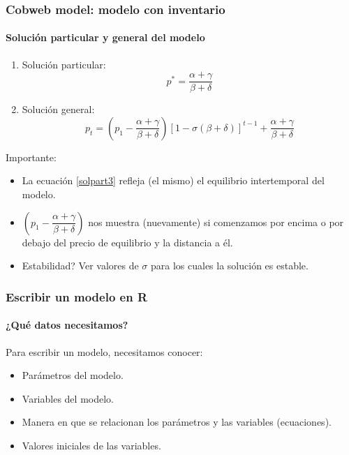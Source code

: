 \documentclass[11pt]{beamer}
\begin{document}
\begin{frame}
	\frametitle{Cobweb model: modelo con inventario}
	\framesubtitle{Solución particular y general del modelo}
	\begin{enumerate}
		\item Solución particular: 	\begin{equation}\label{solpart3}
		p^{*}=\dfrac{\alpha+\gamma}{\beta+\delta}
		\end{equation}
		\item Solución general:
	\begin{equation}
p_t=\left( p_1-\dfrac{\alpha+\gamma}{\beta+\delta}\right) [1-\sigma(\beta+\delta)]^{t-1}+
\dfrac{\alpha+\gamma}{\beta+\delta} 
\end{equation}

	\end{enumerate}
Importante:
\begin{itemize}
	\scriptsize	\item La ecuación \ref{solpart3} refleja (el mismo) el equilibrio intertemporal del modelo.
	\item $\left( p_1-\dfrac{\alpha+\gamma}{\beta+\delta}\right)$ nos muestra (nuevamente) si comenzamos por encima o por debajo del precio de equilibrio y la distancia a él.
	\item Estabilidad? Ver valores de $\sigma$ para los cuales la solución es estable.\\
	\onslide<2->{\textcolor{blue}{Solución: $0<\sigma<\dfrac{2}{\beta+\delta}$}}
\end{itemize}
\end{frame}

\begin{frame}
\frametitle{Escribir un modelo en R}
\framesubtitle{¿Qué datos necesitamos?}
Para escribir un modelo, necesitamos conocer:
\begin{itemize}
	\item Parámetros del modelo.
	\item Variables del modelo.
	\item Manera en que se relacionan los parámetros y las variables (ecuaciones).
	\item Valores iniciales de las variables.
\end{itemize}
\end{frame}
\end{document}
